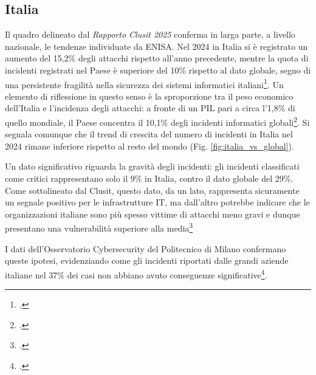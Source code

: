 \subsection{Italia}
Il quadro delineato dal \textit{Rapporto Clusit 2025} conferma in larga parte, a livello nazionale,
le tendenze individuate da ENISA. Nel 2024 in Italia si è registrato un aumento del 15,2\% degli 
attacchi rispetto all’anno precedente, mentre la quota di incidenti registrati nel Paese è superiore
del 10\% rispetto al dato globale, segno di una persistente fragilità nella sicurezza dei sistemi 
informatici italiani\footcite[pp. 30--32]{clusit-report}. Un elemento di riflessione in questo senso
è la sproporzione tra il peso economico dell’Italia e l’incidenza degli attacchi: a fronte di un PIL pari a 
circa l’1,8\% di quello mondiale, il Paese concentra il 10,1\% degli incidenti informatici globali\footcite[p. 30]{clusit-report}.
Si segnala comunque che il trend di crescita del numero di incidenti in Italia nel 2024 rimane 
inferiore rispetto al resto del mondo (Fig. \ref{fig:italia_vs_global}). 


Un dato significativo riguarda la gravità degli incidenti: gli incidenti classificati come critici
rappresentano solo il 9\% in Italia, contro il dato globale del 29\%. Come sottolineato dal Clusit,
questo dato, da un lato, rappresenta sicuramente un segnale positivo per le infrastrutture IT, ma dall'altro
potrebbe indicare che le organizzazioni italiane sono più spesso vittime di attacchi meno gravi e dunque
presentano una vulnerabilità superiore alla media\footcite[pp. 41--42]{clusit-report}

I dati dell'Osservatorio Cybersecurity del Politecnico di Milano confermano queste ipotesi, evidenziando
come gli incidenti riportati dalle grandi aziende italiane nel 37\% dei casi non abbiano avuto conseguenze
significative\footcite[p. 42]{clusit-report}.



